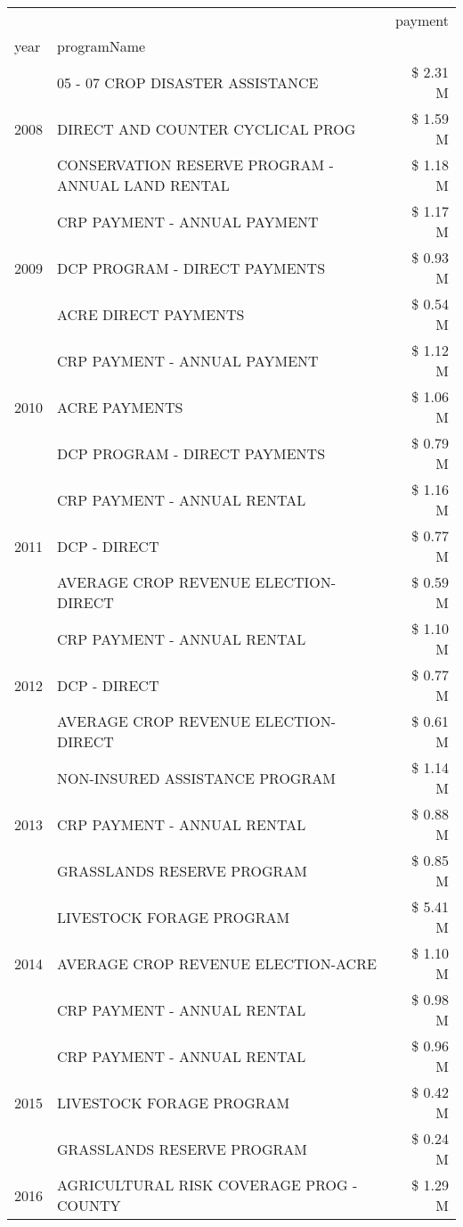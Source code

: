 \begin{tabular}{llr}
\toprule
 &  & payment \\
year & programName &  \\
\midrule
\multirow[t]{3}{*}{2008} & 05 - 07 CROP DISASTER ASSISTANCE & \$ 2.31 M \\
 & DIRECT AND COUNTER CYCLICAL PROG & \$ 1.59 M \\
 & CONSERVATION RESERVE PROGRAM - ANNUAL LAND RENTAL & \$ 1.18 M \\
\cline{1-3}
\multirow[t]{3}{*}{2009} & CRP PAYMENT - ANNUAL PAYMENT & \$ 1.17 M \\
 & DCP PROGRAM - DIRECT PAYMENTS & \$ 0.93 M \\
 & ACRE DIRECT PAYMENTS & \$ 0.54 M \\
\cline{1-3}
\multirow[t]{3}{*}{2010} & CRP PAYMENT - ANNUAL PAYMENT & \$ 1.12 M \\
 & ACRE PAYMENTS & \$ 1.06 M \\
 & DCP PROGRAM - DIRECT PAYMENTS & \$ 0.79 M \\
\cline{1-3}
\multirow[t]{3}{*}{2011} & CRP PAYMENT - ANNUAL RENTAL & \$ 1.16 M \\
 & DCP - DIRECT & \$ 0.77 M \\
 & AVERAGE CROP REVENUE ELECTION-DIRECT & \$ 0.59 M \\
\cline{1-3}
\multirow[t]{3}{*}{2012} & CRP PAYMENT - ANNUAL RENTAL & \$ 1.10 M \\
 & DCP - DIRECT & \$ 0.77 M \\
 & AVERAGE CROP REVENUE ELECTION-DIRECT & \$ 0.61 M \\
\cline{1-3}
\multirow[t]{3}{*}{2013} & NON-INSURED ASSISTANCE PROGRAM & \$ 1.14 M \\
 & CRP PAYMENT - ANNUAL RENTAL & \$ 0.88 M \\
 & GRASSLANDS RESERVE PROGRAM & \$ 0.85 M \\
\cline{1-3}
\multirow[t]{3}{*}{2014} & LIVESTOCK FORAGE PROGRAM & \$ 5.41 M \\
 & AVERAGE CROP REVENUE ELECTION-ACRE & \$ 1.10 M \\
 & CRP PAYMENT - ANNUAL RENTAL & \$ 0.98 M \\
\cline{1-3}
\multirow[t]{3}{*}{2015} & CRP PAYMENT - ANNUAL RENTAL & \$ 0.96 M \\
 & LIVESTOCK FORAGE PROGRAM & \$ 0.42 M \\
 & GRASSLANDS RESERVE PROGRAM & \$ 0.24 M \\
\cline{1-3}
\multirow[t]{3}{*}{2016} & AGRICULTURAL RISK COVERAGE PROG - COUNTY & \$ 1.29 M \\

\end{tabular}
